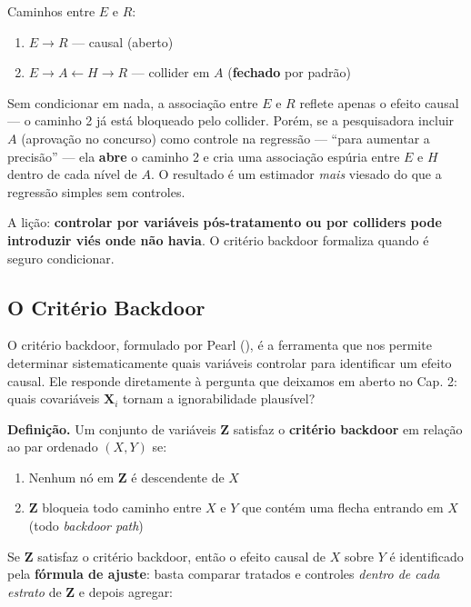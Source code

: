\documentclass[
]{article}
\providecommand{\tightlist}{%
  \setlength{\itemsep}{0pt}\setlength{\parskip}{0pt}}
\begin{document}
Caminhos entre \(E\) e \(R\):

\begin{enumerate}
\def\labelenumi{\arabic{enumi}.}
\tightlist
\item
  \(E \to R\) --- causal (aberto)
\item
  \(E \to A \leftarrow H \to R\) --- collider em \(A\) (\textbf{fechado} por padrão)
\end{enumerate}

Sem condicionar em nada, a associação entre \(E\) e \(R\) reflete apenas o efeito causal --- o caminho 2 já está bloqueado pelo collider. Porém, se a pesquisadora incluir \(A\) (aprovação no concurso) como controle na regressão --- ``para aumentar a precisão'' --- ela \textbf{abre} o caminho 2 e cria uma associação espúria entre \(E\) e \(H\) dentro de cada nível de \(A\). O resultado é um estimador \emph{mais} viesado do que a regressão simples sem controles.

A lição: \textbf{controlar por variáveis pós-tratamento ou por colliders pode introduzir viés onde não havia}. O critério backdoor formaliza quando é seguro condicionar.

\subsection{O Critério Backdoor}\label{o-crituxe9rio-backdoor}

O critério backdoor, formulado por Pearl (), é a ferramenta que nos permite determinar sistematicamente quais variáveis controlar para identificar um efeito causal. Ele responde diretamente à pergunta que deixamos em aberto no Cap. 2: quais covariáveis \(\mathbf{X}_i\) tornam a ignorabilidade plausível?

\textbf{Definição.} Um conjunto de variáveis \(\mathbf{Z}\) satisfaz o \textbf{critério backdoor} em relação ao par ordenado \((X, Y)\) se:

\begin{enumerate}
\def\labelenumi{\arabic{enumi}.}
\tightlist
\item
  Nenhum nó em \(\mathbf{Z}\) é descendente de \(X\)
\item
  \(\mathbf{Z}\) bloqueia todo caminho entre \(X\) e \(Y\) que contém uma flecha entrando em \(X\) (todo \emph{backdoor path})
\end{enumerate}

Se \(\mathbf{Z}\) satisfaz o critério backdoor, então o efeito causal de \(X\) sobre \(Y\) é identificado pela \textbf{fórmula de ajuste}: basta comparar tratados e controles \emph{dentro de cada estrato} de \(\mathbf{Z}\) e depois agregar:
\end{document}
